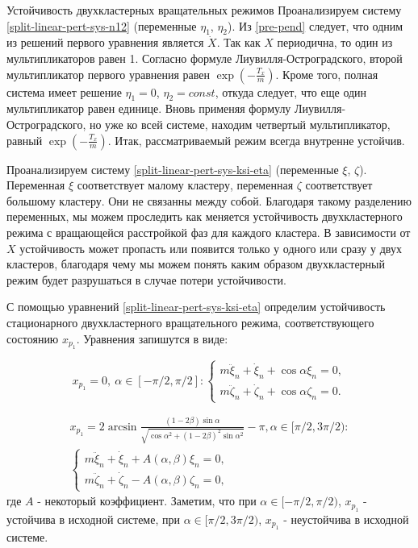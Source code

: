 \begin{chapter}{Устойчивость двухкластерных вращательных режимов}
	Проанализируем систему \eqref{split-linear-pert-sys-n12} (переменные $\eta_1$, $\eta_2$).
	Из \eqref{pre-pend} следует, что одним из
	решений первого уравнения является $\dot{X}$.
	Так как $X$ периодична, то один из мультипликаторов равен 1.
	Согласно формуле Лиувилля-Остроградского, второй мультипликатор первого уравнения равен $\exp{(-\frac{T_x}{m})}$.
	Кроме того, полная система имеет решение $\eta_1 = 0$, $\eta_2 = const$,
	откуда следует, что еще один мультипликатор равен единице.
	Вновь применяя формулу Лиувилля-Остроградского, но
	уже ко всей системе, находим четвертый мультипликатор,
	равный $\exp{(-\frac{T_x}{m})}$. 
	Итак, рассматриваемый режим всегда внутренне устойчив.

	
	Проанализируем систему \eqref{split-linear-pert-sys-ksi-eta} (переменные $\xi$, $\zeta$).
	Переменная $\xi$ соответствует малому кластеру, переменная $\zeta$ соответствует большому кластеру. 
	Они не связанны между собой.
	Благодаря такому разделению переменных, мы можем проследить как меняется устойчивость
	двухкластерного режима с вращающейся расстройкой фаз для каждого кластера. В зависимости от $X$ устойчивость
	может пропасть или появится только у одного или сразу у двух кластеров, благодаря чему мы можем
	понять каким образом двухкластерный режим будет разрушаться в случае потери устойчивости.
	
	С помощью уравнений \eqref{split-linear-pert-sys-ksi-eta} определим устойчивость стационарного
	двухкластерного вращательного режима, соответствующего состоянию $x_{p_1}$.
	Уравнения запишутся в виде:
	
	\begin{equation}
		x_{p_1} = 0, \ \alpha \in [-\pi/ 2, \pi/2]: 
		\begin{cases}
			m\ddot{\xi}_n + \dot{\xi}_n + \cos{\alpha}\xi_n = 0, \\
			m\ddot{\zeta}_n + \dot{\zeta}_n + \cos{\alpha}\zeta_n = 0.
		\end{cases}
	\end{equation}
	
	\begin{equation}
		\begin{split}
			x_{p_1} = 2\arcsin{\frac{(1 - 2\beta) \sin{\alpha}}{\sqrt{\cos{\alpha}^2 + (1 - 2\beta)^2\sin{\alpha}^2}}} - \pi , \alpha \in [\pi/2, 3\pi/2): \\ 
			\begin{cases}
				m\ddot{\xi}_n + \dot{\xi}_n + A(\alpha, \beta) \xi_n = 0, \\
				m\ddot{\zeta}_n + \dot{\zeta}_n -A(\alpha, \beta) \zeta_n = 0,
			\end{cases}
		\end{split}
	\end{equation}
	где $A$ - некоторый коэффициент. Заметим, что при $\alpha \in [-\pi/ 2, \pi/2)$, $x_{p_1}$ - устойчива в исходной системе,
	при $\alpha \in [\pi/2, 3\pi/2)$, $x_{p_1}$ - неустойчива в исходной системе.


\end{chapter}
